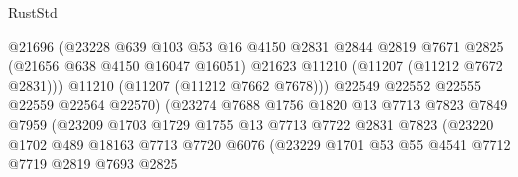 \begin{lexlean}{RustStd}
\begin{coremodule}
                                    @21696
                                    (@23228
                                      @639
                                      @103
                                      @53
                                      @16
                                      @4150
                                      @2831
                                      @2844
                                      @2819
                                      @7671
                                      @2825
                                      (@21656 @638 @4150 @16047 @16051)
                                      @21623
                                      @11210
                                      (@11207 (@11212 @7672 @2831)))
                                    @11210
                                    (@11207 (@11212 @7662 @7678)))
                                  @22549
                                  @22552
                                  @22555
                                  @22559
                                  @22564
                                  @22570)
                                (@23274
                                  @7688
                                  @1756
                                  @1820
                                  @13
                                  @7713
                                  @7823
                                  @7849
                                  @7959
                                  (@23209
                                    @1703
                                    @1729
                                    @1755
                                    @13
                                    @7713
                                    @7722
                                    @2831
                                    @7823
                                    (@23220
                                      @1702
                                      @489
                                      @18163
                                      @7713
                                      @7720
                                      @6076
                                      (@23229
                                        @1701
                                        @53
                                        @55
                                        @4541
                                        @7712
                                        @7719
                                        @2819
                                        @7693
                                        @2825

\end{coremodule}
\end{lexlean}
